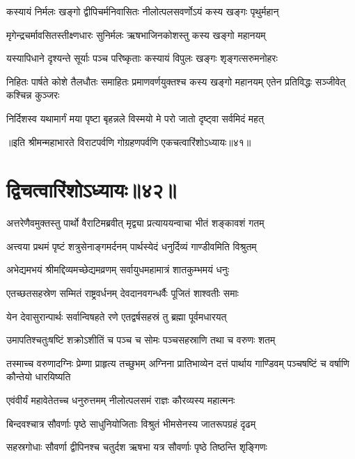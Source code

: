 \twolineshloka
{कस्यायं निर्मलः खङ्गो द्वीपिचर्मनिवासितः}
{नीलोत्पलसवर्णोऽयं कस्य खङ्गः पृथुर्महान्}


\twolineshloka
{मृगेन्द्रचर्मावसितस्तीक्ष्णधारः सुनिर्मलः}
{ऋषभाजिनकोशस्तु कस्य खङ्गो महानयम्}


\twolineshloka
{यस्यापिधाने दृश्यन्ते सूर्याः पञ्च परिष्कृताः}
{कस्यायं विपुलः खङ्गः शृङ्गत्सरुमनोहरः}


\threelineshloka
{निहितः पार्षते कोशे तैलधौतः समाहितः}
{प्रमाणवर्णयुक्तश्च कस्य खङ्गो महानयम्}
{एतेन प्रतिविद्धः सञ्जीवेत् कश्चिन्न कुञ्जरः}


\twolineshloka
{निर्दिशस्व यथामार्गं मया पृष्टा बृहन्नले}
{विस्मयो मे परो जातो दृष्ट्वा सर्वमिदं महत्}

॥इति श्रीमन्महाभारते विराटपर्वणि गोग्रहणपर्वणि एकचत्वारिंशोऽध्यायः॥४१॥

\chapter{द्विचत्वारिंशोऽध्यायः॥४२॥}

\twolineshloka
{अत्तरेणैवमुक्तस्तु पार्थो वैराटिमब्रवीत्}
{मृद्व्या प्रत्याययन्वाचा भीतं शङ्कावशं गतम्}




\twolineshloka
{अत्त्वया प्रथमं पृष्टं शत्रुसेनाङ्गमर्दनम्}
{पार्थस्येदं धनुर्दिव्यं गाण्डीवमिति विश्रुतम्}


\twolineshloka
{अभेद्यमभयं श्रीमद्दिव्यमच्छेद्यमव्रणम्}
{सर्वायुधमहामात्रं शातकुम्भमयं धनुः}


\twolineshloka
{एतच्छतसहस्रेण सम्मितं राष्ट्रवर्धनम्}
{देवदानवगन्धर्वैः पूजितं शाश्वतीः समाः}


\twolineshloka
{येन देवासुरान्पार्थः सर्वान्विषहते रणे}
{एतद्वर्षसहस्रं तु ब्रह्मा पूर्वमधारयत्}


\twolineshloka
{उमापतिश्चतुःषष्टिं शक्रोऽशीतिं च पञ्च च}
{सोमः पञ्चसहस्राणि तथा च वरुणः शतम्}


\threelineshloka
{तस्माच्च वरुणादग्निः प्रेम्णा प्राहृत्य तच्छुभम्}
{अग्निना प्रातिभाव्येन दत्तं पार्थाय गाण्डिवम्}
{पञ्चषष्टिं च वर्षाणि कौन्तेयो धारयिष्यति}


\twolineshloka
{एवंवीर्यं महावेतेतच्च धनुरुत्तमम्}
{नीलोत्पलसमं राज्ञः कौरव्यस्य महात्मनः}


\twolineshloka
{बिन्दवश्चात्र सौवर्णाः पृष्ठे साधुनियोजिताः}
{विश्रुतं भीमसेनस्य जातरूपग्रहं दृढम्}


\twolineshloka
{सहस्रगोधाः सौवर्णा द्वीपिनश्च चतुर्दश}
{ऋषभा यत्र सौवर्णाः पृष्ठे तिष्ठन्ति शृङ्गिणः}


